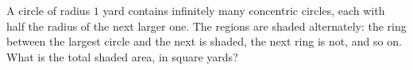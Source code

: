 A circle of radius $1$ yard contains infinitely many concentric circles, each with half the radius of the next larger one. The regions are shaded alternately: the ring between the largest circle and the next is shaded, the next ring is not, and so on. What is the total shaded area, in square yards?
